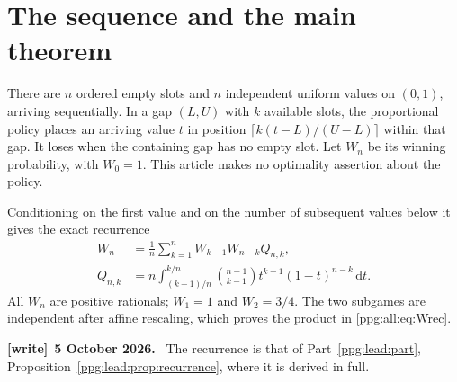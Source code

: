 \documentclass[11pt,letterpaper]{article}
\theoremstyle{remark}\newtheorem{remark}[theorem]{Remark}
\numberwithin{equation}{section}
\newcommand{\dd}{\mathrm d}
\newenvironment{writenote}[1][]{\par\smallskip\begingroup\small
 \noindent\textbf{[write]}\if\relax\detokenize{#1}\relax\else~\textbf{#1.}\fi\ }%
 {\par\endgroup\smallskip}
\begin{document}
\section{The sequence and the main theorem}\label{ppg:all:sec:main}
There are $n$ ordered empty slots and $n$ independent uniform values on $(0,1)$, arriving sequentially. In a gap $(L,U)$ with $k$ available slots, the proportional policy places an arriving value $t$ in position $\lceil k(t-L)/(U-L)\rceil$ within that gap. It loses when the containing gap has no empty slot. Let $W_n$ be its winning probability, with $W_0=1$. This article makes no optimality assertion about the policy.

Conditioning on the first value and on the number of subsequent values below it gives the exact recurrence
\begin{align}
 W_n&=\frac1n\sum_{k=1}^n W_{k-1}W_{n-k}Q_{n,k},\label{ppg:all:eq:Wrec}\\
 Q_{n,k}&=n\int_{(k-1)/n}^{k/n}\binom{n-1}{k-1}
          t^{k-1}(1-t)^{n-k}\,\dd t.\label{ppg:all:eq:Q}
\end{align}
All $W_n$ are positive rationals; $W_1=1$ and $W_2=3/4$. The two subgames are independent after affine rescaling, which proves the product in \eqref{ppg:all:eq:Wrec}.
\begin{writenote}[5 October 2026]
The recurrence is that of Part~\ref{ppg:lead:part}, Proposition~\ref{ppg:lead:prop:recurrence}, where it is derived in full.
\end{writenote}
\end{document}
